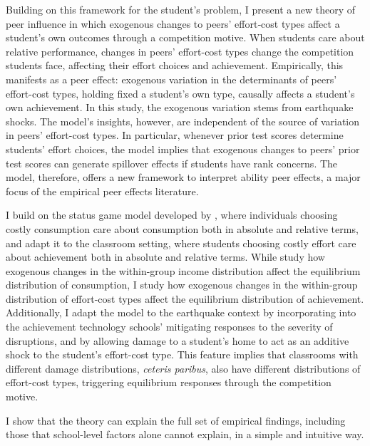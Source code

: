 Building on this framework for the student's problem, I present a new theory of peer influence in which exogenous changes to peers’ effort‐cost types affect a student’s own outcomes through a competition motive. When students care about relative performance, changes in peers' effort-cost types change the competition students face, affecting their effort choices and achievement. Empirically, this manifests as a peer effect: exogenous variation in the determinants of peers' effort-cost types, holding fixed a student's own type, causally affects a student's own achievement. In this study, the exogenous variation stems from earthquake shocks. The model's insights, however, are independent of the source of variation in peers' effort-cost types. In particular, whenever prior test scores determine students' effort choices, the model implies that exogenous changes to peers' prior test scores can generate spillover effects if students have rank concerns. The model, therefore, offers a new framework to interpret ability peer effects, a major focus of the empirical peer effects literature.\par
I build on the status game model developed by \cite{hopkins2004running}, where individuals choosing costly consumption care about consumption both in absolute and relative terms, and adapt it to the classroom setting, where students choosing costly effort care about achievement both in absolute and relative terms. While \cite{hopkins2004running} study how exogenous changes in the within-group income distribution affect the equilibrium distribution of consumption, I study how exogenous changes in the within-group distribution of effort-cost types affect the equilibrium distribution of achievement. Additionally, I adapt the model to the earthquake context by incorporating into the achievement technology schools' mitigating responses to the severity of disruptions, and by allowing damage to a student's home to act as an additive shock to the student's effort-cost type. This feature implies that classrooms with different damage distributions, {\itshape ceteris paribus}, also have different distributions of effort-cost types, triggering equilibrium responses through the competition motive.\par 



 I show that the theory can explain the full set of empirical findings, including those that school-level factors alone cannot explain, in a simple and intuitive way.\par 



